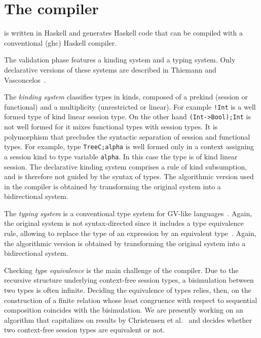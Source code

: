 \section{The \freest{} compiler}
\label{sec:compiler}

\freest{} is written in Haskell and generates Haskell code that can be
compiled with a conventional (ghc) Haskell compiler.

The validation phase features a kinding system and a typing
system. Only declarative versions of these systems are described in
Thiemann and Vasconcelos~\cite{DBLP:conf/icfp/ThiemannV16}.

The \emph{kinding system} classifies types in kinds, composed of a
prekind (session or functional) and a multiplicity (unrestricted or
linear). For example \lstinline|!Int| is a well formed type of kind
linear session type. On the other hand \lstinline|(Int->Bool);Int| is
not well formed for it mixes functional types with session types.
%
It is polymorphism that precludes the syntactic separation of session
and functional types. For example, type \lstinline|TreeC;alpha| is
well formed only in a context assigning a session kind to type
variable \lstinline|alpha|. In this case the type is of kind linear
session.
%
The declarative kinding system comprises a rule of kind subsumption,
and is therefore not guided by the syntax of types. The algorithmic
version used in the compiler is obtained by transforming the original
system into a bidirectional system.

The \emph{typing system} is a conventional type system for GV-like
languages~\cite{DBLP:journals/jfp/GayV10}. Again, the original system
is not syntax-directed since it includes a type equivalence rule,
allowing to replace the type of an expression by an equivalent
type~\cite{DBLP:conf/icfp/ThiemannV16}. Again, the algorithmic version
is obtained by transforming the original system into a bidirectional
system.

Checking \emph{type equivalence} is the main challenge of the
compiler. Due to the recursive structure underlying context-free 
session types, a bisimulation between two types is often infinite. 
Deciding the equivalence of types relies, then, on the construction 
of a finite relation whose least congruence with respect to  
sequential composition coincides with the bisimulation. We are 
presently working on an algorithm that capitalizes on results by 
Christensen et al.~\cite{DBLP:journals/iandc/ChristensenHS95} and 
decides whether two context-free session types are equivalent or not.  

